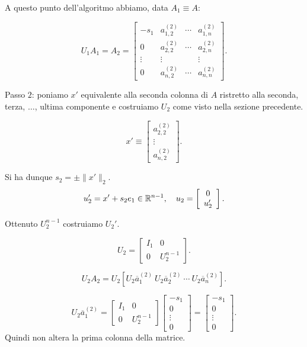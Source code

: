 A questo punto dell'algoritmo abbiamo, data $A_1 \equiv A$:

\[U_1A_1 = A_2 = \left[
\begin{array}{cccc}
-s_1 & a_{1,2}^{(2)} & \cdots & a_{1,n}^{(2)} \\
0   & a_{2,2}^{(2)} & \cdots & a_{2,n}^{(2)} \\
\vdots & \vdots & & \vdots \\
0 & a_{n,2}^{(2)} & \cdots & a_{n,n}^{(2)}
\end{array}
\right].\]

Passo $2$: poniamo $x'$ equivalente alla seconda colonna di $A$
ristretto alla seconda, terza, $\ldots$, ultima componente e costruiamo
$U_2$ come visto nella sezione precedente.

\[x' \equiv\left[
\begin{array}{c}
 a_{2,2}^{(2)} \\
 \vdots \\
 a_{n,2}^{(2)}
\end{array}
\right].
\]

Si ha dunque $s_2 =\pm \|x'\|_2$.
\[u_2' = x' + s_2e_1 \in \mathbb{R}^{n-1}, \quad u_2 =
\left[
\begin{array}{c}
0 \\
u_2'
\end{array}\right].\]

Ottenuto $U_2^{n-1}$ costruiamo $U_2'$.

\[U_2 = \left[
\begin{array}{c|c}
I_1 & 0 \\
\hline
0 & U_2^{n-1}
\end{array}
\right].\]

\[
U_2A_2 = U_2\left[U_2\overline{a}_1^{(2)} \ U_2\overline{a}_2^{(2)} \ \cdots\
U_2\overline{a}_n^{(2)}\right].\]

\[U_2\overline{a}_1^{(2)} = \left[
\begin{array}{c|c}
I_1 & 0 \\
\hline
0 & U_2^{n-1}
\end{array}
\right]\left[
\begin{array}{c}
-s_1 \\ 0 \\ \vdots \\ 0
\end{array}
\right] = \left[
\begin{array}{c}
-s_1 \\ 0 \\ \vdots \\ 0
\end{array}
\right].\]
Quindi non altera la prima colonna della matrice.

